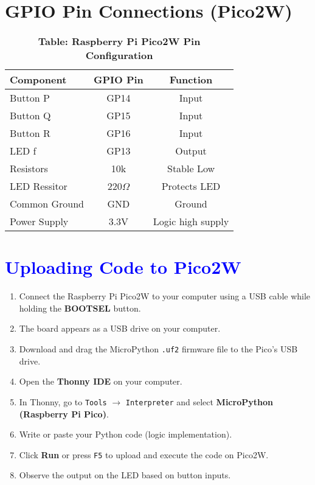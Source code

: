 \documentclass[twocolumn]{article}
\begin{document}
\section*{GPIO Pin Connections (Pico2W)}

\begin{table}[h!]
\centering
\renewcommand{\arraystretch}{1.3}
\begin{tabular}{|>{\raggedright}p{4cm}|c|c|}
\hline
\textbf{Component} & \textbf{GPIO Pin} & \textbf{Function} \\
\hline
Button P & GP14 & Input \\
Button Q & GP15 & Input \\
Button R & GP16 & Input \\
LED f   & GP13 & Output \\
Resistors & 10k &Stable Low\\
LED Ressitor & 220$\Omega$ & Protects LED \\
Common Ground      & GND  & Ground \\
Power Supply       & 3.3V & Logic high supply \\
\hline
\end{tabular}
\caption*{\textbf{Table: Raspberry Pi Pico2W Pin Configuration}}
\end{table}

\section*{\textcolor{blue}{Uploading Code to Pico2W}}

\begin{enumerate}
    \item Connect the Raspberry Pi Pico2W to your computer using a USB cable while holding the \textbf{BOOTSEL} button.
    \item The board appears as a USB drive on your computer.
    \item Download and drag the MicroPython \texttt{.uf2} firmware file to the Pico's USB drive.
    \item Open the \textbf{Thonny IDE} on your computer.
    \item In Thonny, go to \texttt{Tools} $\rightarrow$ \texttt{Interpreter} and select \textbf{MicroPython (Raspberry Pi Pico)}.
    \item Write or paste your Python code (logic implementation).
    \item Click \textbf{Run} or press \texttt{F5} to upload and execute the code on Pico2W.
    \item Observe the output on the LED based on button inputs.
\end{enumerate}
\end{document}
